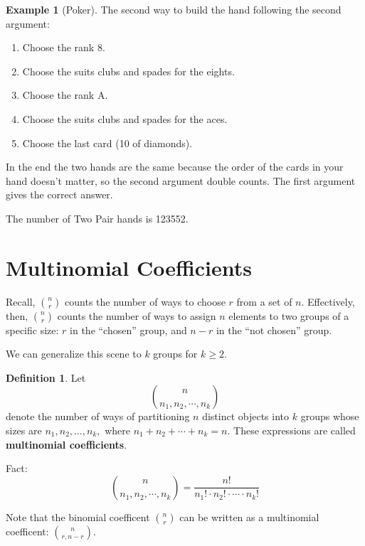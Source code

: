 \documentclass[
]{book}
\providecommand{\tightlist}{%
  \setlength{\itemsep}{0pt}\setlength{\parskip}{0pt}}
\theoremstyle{definition}
\newtheorem{definition}{Definition}[chapter]
\theoremstyle{definition}
\newtheorem{example}{Example}[chapter]
\theoremstyle{definition}
\theoremstyle{definition}
\theoremstyle{remark}
\begin{document}
\begin{example}[Poker]
The second way to build the hand following the second argument:

\begin{enumerate}
\def\labelenumi{\arabic{enumi}.}
\tightlist
\item
  Choose the rank 8.
\item
  Choose the suits clubs and spades for the eights.
\item
  Choose the rank A.
\item
  Choose the suits clubs and spades for the aces.
\item
  Choose the last card (10 of diamonds).
\end{enumerate}

In the end the two hands are the same because the order of the cards in your hand doesn't matter, so the second argument double counts. The first argument gives the correct answer.

The number of Two Pair hands is 123552.
\end{example}

\section{Multinomial Coefficients}\label{multinomial-coefficients}

Recall, \(\binom{n}{r}\) counts the number of ways to choose \(r\) from a set of \(n\). Effectively, then, \(\binom{n}{r}\) counts the number of ways to assign \(n\) elements to two groups of a specific size: \(r\) in the ``chosen'' group, and \(n-r\) in the ``not chosen'' group.

We can generalize this scene to \(k\) groups for \(k \geq 2\).

\begin{definition}
\protect\hypertarget{def:multinomial-coefficients}{}\label{def:multinomial-coefficients}Let
\[\binom{n}{n_1, n_2, \cdots, n_k}\] denote the number of ways of partitioning \(n\) distinct objects into \(k\) groups whose sizes are \(n_1, n_2, \ldots, n_k,\) where \(n_1 + n_2 + \cdots + n_k = n\). These expressions are called \textbf{multinomial coefficients}.
\end{definition}

Fact:
\begin{equation} 
  \binom{n}{n_1, n_2, \cdots, n_k} = \frac{n!}{n_1! \cdot n_2! \cdot \cdots \cdot n_k!}
  \label{eq:multinomial}
\end{equation}

Note that the binomial coefficent \(\displaystyle \binom{n}{r}\) can be written as a multinomial coefficent: \(\displaystyle \binom{n}{r, n-r}\).
\end{document}
